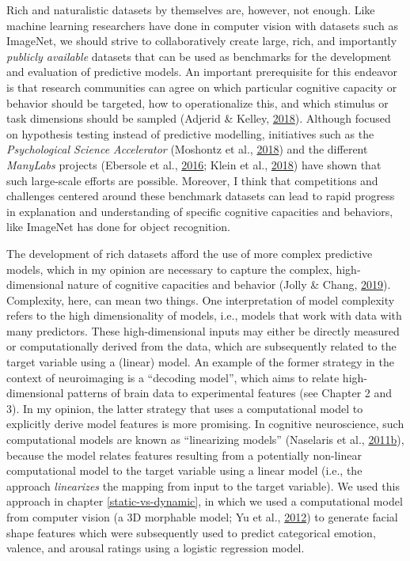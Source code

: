\documentclass[11pt,american,]{memoir} %
\begin{document}
Rich and naturalistic datasets by themselves are, however, not enough. Like machine learning researchers have done in computer vision with datasets such as ImageNet, we should strive to collaboratively create large, rich, and importantly \emph{publicly available} datasets that can be used as benchmarks for the development and evaluation of predictive models. An important prerequisite for this endeavor is that research communities can agree on which particular cognitive capacity or behavior should be targeted, how to operationalize this, and which stimulus or task dimensions should be sampled (Adjerid \& Kelley, \protect\hyperlink{ref-Adjerid2018-vs}{2018}). Although focused on hypothesis testing instead of predictive modelling, initiatives such as the \emph{Psychological Science Accelerator} (Moshontz et al., \protect\hyperlink{ref-Moshontz2018-rc}{2018}) and the different \emph{ManyLabs} projects (Ebersole et al., \protect\hyperlink{ref-Ebersole2016-cr}{2016}; Klein et al., \protect\hyperlink{ref-Klein2018-un}{2018}) have shown that such large-scale efforts are possible. Moreover, I think that competitions and challenges centered around these benchmark datasets can lead to rapid progress in explanation and understanding of specific cognitive capacities and behaviors, like ImageNet has done for object recognition.

The development of rich datasets afford the use of more complex predictive models, which in my opinion are necessary to capture the complex, high-dimensional nature of cognitive capacities and behavior (Jolly \& Chang, \protect\hyperlink{ref-Jolly2019-lx}{2019}). Complexity, here, can mean two things. One interpretation of model complexity refers to the high dimensionality of models, i.e., models that work with data with many predictors. These high-dimensional inputs may either be directly measured or computationally derived from the data, which are subsequently related to the target variable using a (linear) model. An example of the former strategy in the context of neuroimaging is a ``decoding model'', which aims to relate high-dimensional patterns of brain data to experimental features (see Chapter 2 and 3). In my opinion, the latter strategy that uses a computational model to explicitly derive model features is more promising. In cognitive neuroscience, such computational models are known as ``linearizing models'' (Naselaris et al., \protect\hyperlink{ref-Naselaris2011-oh}{2011}\protect\hyperlink{ref-Naselaris2011-oh}{b}), because the model relates features resulting from a potentially non-linear computational model to the target variable using a linear model (i.e., the approach \emph{linearizes} the mapping from input to the target variable). We used this approach in chapter \ref{static-vs-dynamic}, in which we used a computational model from computer vision (a 3D morphable model; Yu et al., \protect\hyperlink{ref-Yu2012-ag}{2012}) to generate facial shape features which were subsequently used to predict categorical emotion, valence, and arousal ratings using a logistic regression model.
\end{document}
